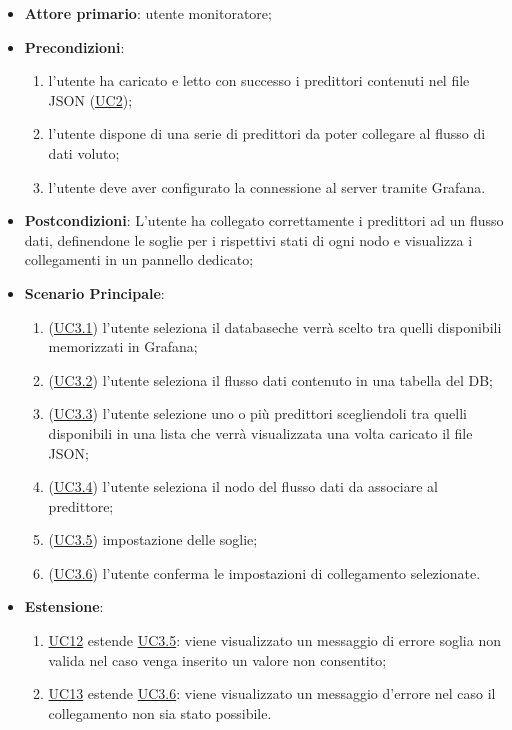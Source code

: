 		\begin{itemize}
			\item\textbf{Attore primario}: utente monitoratore;
			\item\textbf{Precondizioni}: 
				\begin{enumerate}
					\item l’utente ha caricato e letto con successo i predittori contenuti nel file JSON (\hyperref[par:UC2]{UC2});
					\item l’utente dispone di una serie di predittori da poter collegare al flusso di dati voluto;
					\item l’utente deve aver configurato la connessione al server tramite Grafana.	
				\end{enumerate}
			\item\textbf{Postcondizioni}: L’utente ha collegato correttamente i predittori ad un flusso dati, definendone le soglie per i rispettivi stati di ogni nodo e visualizza i collegamenti in un pannello dedicato;
			\item\textbf{Scenario Principale}:
				\begin{enumerate}
					\item (\hyperref[par:UC3.1]{UC3.1}) l’utente seleziona il database\glo che verrà scelto tra quelli disponibili memorizzati in Grafana;
					\item (\hyperref[par:UC3.2]{UC3.2}) l’utente seleziona il flusso dati contenuto in una tabella del DB;
					\item (\hyperref[par:UC3.3]{UC3.3}) l'utente selezione uno o più predittori scegliendoli tra quelli disponibili in una lista che verrà visualizzata una volta caricato il file JSON; 
					\item (\hyperref[par:UC3.4]{UC3.4}) l'utente seleziona il nodo del flusso dati da associare al predittore;
					\item (\hyperref[par:UC3.5]{UC3.5}) impostazione delle soglie;
					\item (\hyperref[par:UC3.6]{UC3.6}) l'utente conferma le impostazioni di collegamento selezionate.	
				\end{enumerate}
			\item\textbf{Estensione}: 
				\begin{enumerate}
					\item\hyperref[par:UC12]{UC12} estende \hyperref[par:UC3.5]{UC3.5}: viene visualizzato un messaggio di errore soglia non valida nel caso venga inserito un valore non consentito;
					\item\hyperref[par:UC13]{UC13} estende \hyperref[par:UC3.6]{UC3.6}: viene visualizzato un messaggio d’errore nel caso il collegamento non sia stato possibile.

\end{enumerate}
\end{itemize}
